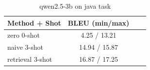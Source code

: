 \begin{table}[ht]
\centering
\small
\caption{qwen2.5-3b on java task}
\begin{tabular}{lccc}
\hline
Method + Shot & BLEU (min/max) \\
\hline
zero 0-shot & 4.25 / 13.21 \\
naive 3-shot & 14.94 / 15.87 \\
retrieval 3-shot & 16.87 / 17.25 \\
\hline
\end{tabular}
\end{table}
